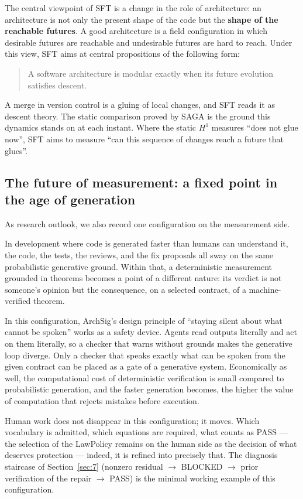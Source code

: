 The central viewpoint of SFT is a change in the role of architecture:
an architecture is not only the present shape of the code but the
\textbf{shape of the reachable futures}. A good architecture is a
field configuration in which desirable futures are reachable and
undesirable futures are hard to reach. Under this view, SFT aims at
central propositions of the following form:

\begin{quote}
A software architecture is modular exactly when its future evolution
satisfies descent.
\end{quote}

A merge in version control is a gluing of local changes, and SFT reads
it as descent theory. The static comparison proved by SAGA is the
ground this dynamics stands on at each instant. Where the static
$H^1$ measures ``does not glue now'', SFT aims to measure ``can this
sequence of changes reach a future that glues''.

\subsection{The future of measurement: a fixed point in the age of generation}\label{sec:95}

As research outlook, we also record one configuration on the
measurement side.

In development where code is generated faster than humans can
understand it, the code, the tests, the reviews, and the fix proposals
all sway on the same probabilistic generative ground. Within that, a
deterministic measurement grounded in theorems becomes a point of a
different nature: its verdict is not someone's opinion but the
consequence, on a selected contract, of a machine-verified theorem.

In this configuration, ArchSig's design principle of ``staying silent
about what cannot be spoken'' works as a safety device. Agents read
outputs literally and act on them literally, so a checker that warns
without grounds makes the generative loop diverge. Only a checker that
speaks exactly what can be spoken from the given contract can be
placed as a gate of a generative system. Economically as well, the
computational cost of deterministic verification is small compared to
probabilistic generation, and the faster generation becomes, the
higher the value of computation that rejects mistakes before
execution.

Human work does not disappear in this configuration; it moves. Which
vocabulary is admitted, which equations are required, what counts as
PASS --- the selection of the LawPolicy remains on the human side as
the decision of what deserves protection --- indeed, it is refined into
precisely that. The diagnosis staircase of Section~\ref{sec:7} (nonzero residual
$\to$ BLOCKED $\to$ prior verification of the repair $\to$ PASS) is
the minimal working example of this configuration.

